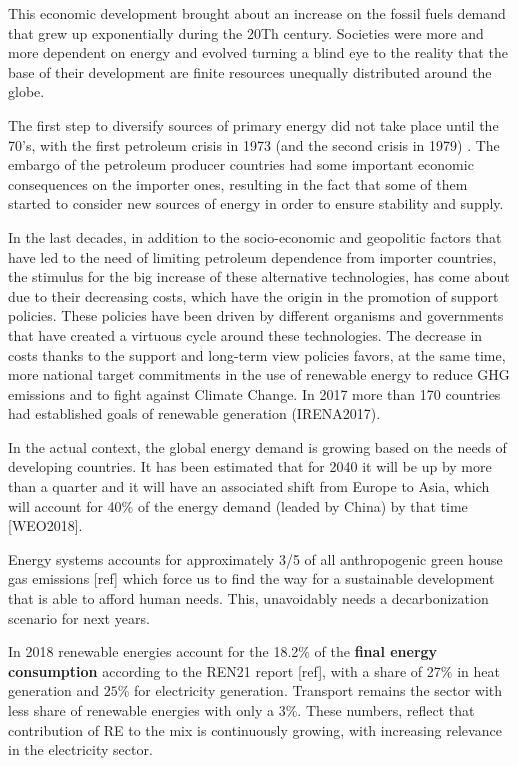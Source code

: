 This economic development brought about an increase on the fossil fuels demand that grew up exponentially during the 20Th century. Societies were more and more dependent on energy and evolved turning a blind eye to the reality that the base of their development are finite resources unequally distributed around the globe.

The first step to diversify sources of primary energy did not take place until the 70's, with the first petroleum crisis in 1973 (and the second crisis in 1979) \cite*{Sorensen1991}. The embargo of the petroleum producer countries had some important economic consequences on the importer ones, resulting in the fact that some of them started to consider new sources of energy in order to ensure stability and supply.

In the last decades, in addition to the socio-economic and geopolitic factors that have led to the need of limiting petroleum dependence from importer countries, the stimulus for the big increase of these alternative technologies, has come about due to their decreasing costs, which have the origin in the promotion of support policies. These policies have been driven by different organisms and governments that have created a virtuous cycle around these technologies. The decrease in costs thanks to the support and long-term view policies favors, at the same time, more national target commitments in the use of renewable energy to reduce GHG emissions and to fight against Climate Change. In 2017 more than 170 countries had established goals of renewable generation (IRENA2017).
 
In the actual context, the global energy demand is growing based on the needs of developing countries. It has been estimated that for 2040 it will be up by more than a quarter and it will have an associated shift from Europe to Asia, which will account for 40$\%$ of the energy demand (leaded by China) by that time [WEO2018].

Energy systems accounts for approximately 3/5 of all anthropogenic green house gas emissions [ref] which force us to find the way for a sustainable development that is able to afford human needs. This, unavoidably needs a decarbonization scenario for next years.  

In 2018 renewable energies account for the 18.2$\%$ of the \textbf{final energy consumption} according to the REN21 report [ref], with a share of 27$\%$ in heat generation and $25\%$ for electricity generation. Transport remains the sector with less share of renewable energies with only a $3\%$. These numbers, reflect that contribution of RE to the mix is continuously growing, with increasing relevance in the electricity sector.

